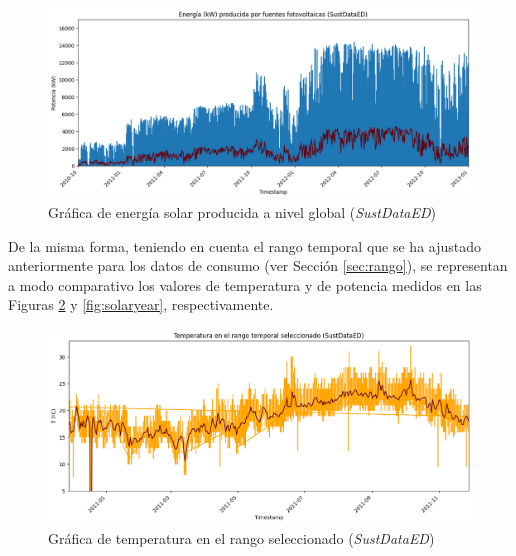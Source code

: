 \begin{figure}[h!]
  \centering
  \includegraphics[width=1\textwidth]{img/diseno/matplotsolar.png}
  \caption{Gráfica de energía solar producida a nivel global (\textit{SustDataED})}
  \label{fig:solar}
\end{figure}

\vspace{3mm}

\pagebreak

De la misma forma, teniendo en cuenta el rango temporal que se ha ajustado anteriormente para los datos de consumo (ver Sección \ref{sec:rango}), se representan a modo comparativo los valores de temperatura y de potencia medidos en las Figuras \ref{fig:temp} y \ref{fig:solaryear}, respectivamente. 

\vspace{3mm}

\begin{figure}[H]
  \centering
  \includegraphics[width=1\textwidth]{img/diseno/temp.png}
  \caption{Gráfica de temperatura en el rango seleccionado (\textit{SustDataED})}
  \label{fig:temp}
\end{figure}

\vspace{3mm}

